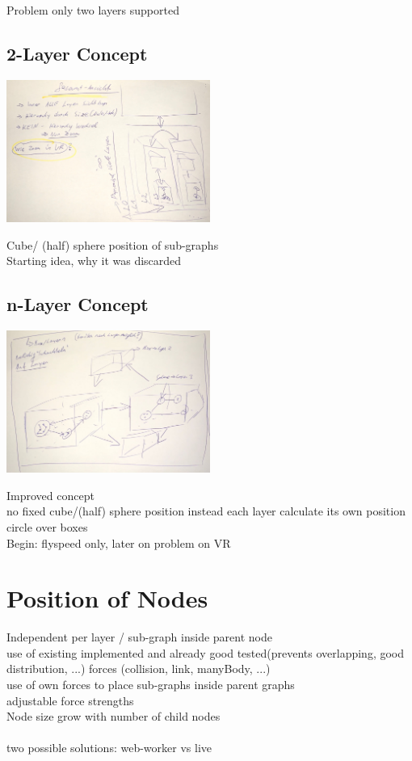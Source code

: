 Problem only two layers supported

\subsection{2-Layer Concept}
\includegraphics[width=0.5\textwidth]{chapters/graphics/concept2.jpg}

Cube/ (half) sphere position of sub-graphs \\
Starting idea, why it was discarded

\subsection{n-Layer Concept}
\includegraphics[width=0.5\textwidth]{chapters/graphics/concept1.jpg}

Improved concept \\
no fixed cube/(half) sphere position instead each layer calculate its own position \\
circle over boxes \\
Begin: flyspeed only, later on problem on VR \\

\section{Position of Nodes}

Independent per layer / sub-graph inside parent node \\
use of existing implemented and already good tested(prevents overlapping, good distribution, ...) forces (collision, link, manyBody, ...) \\
use of own forces to place sub-graphs inside parent graphs \\
adjustable force strengths \\
Node size grow with number of child nodes \\
\\
two possible solutions: web-worker vs live \\

